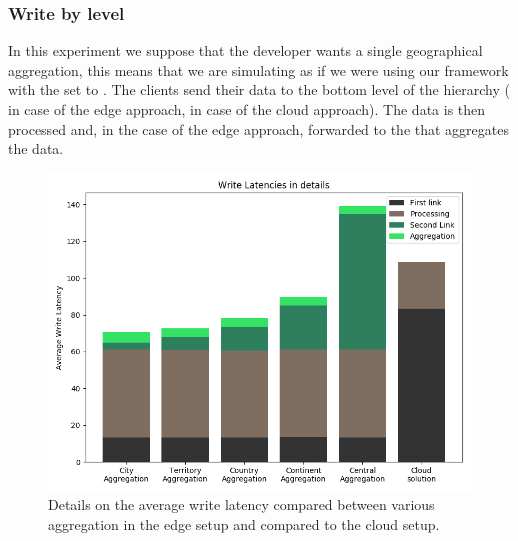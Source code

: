 \subsubsection{Write by level}
In this experiment we suppose that the developer wants a single geographical aggregation, this means that we are simulating as if we were using our framework with the  set to .
The clients send their data to the bottom level of the hierarchy ( in case of the edge approach,  in case of the cloud approach). The data is then processed and, in the case of the edge approach, forwarded to the  that aggregates the data.

\begin{figure}[H]
    \centering
    \includegraphics[width=0.95\linewidth]{Figures/Evaluation/write-by-latency2.png}
    \caption{Details on the average write latency compared between various aggregation in the edge setup and compared to the cloud setup.}
    \label{fig:write-by-latency2}
\end{figure}

